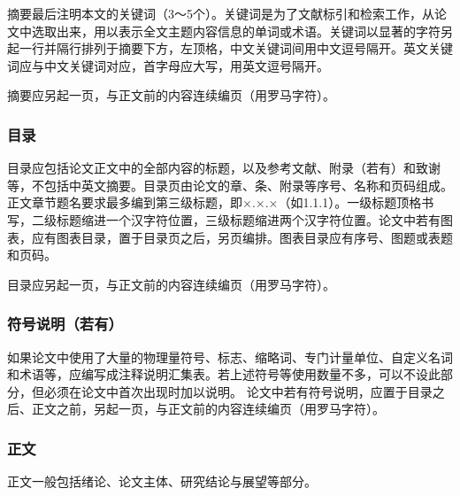 摘要最后注明本文的关键词（3～5个）。关键词是为了文献标引和检索工作，从论文中选取出来，用以表示全文主题内容信息的单词或术语。关键词以显著的字符另起一行并隔行排列于摘要下方，左顶格，中文关键词间用中文逗号隔开。英文关键词应与中文关键词对应，首字母应大写，用英文逗号隔开。

摘要应另起一页，与正文前的内容连续编页（用罗马字符）。
\subsubsection{目录}
目录应包括论文正文中的全部内容的标题，以及参考文献、附录（若有）和致谢等，不包括中英文摘要。目录页由论文的章、条、附录等序号、名称和页码组成。正文章节题名要求最多编到第三级标题，即×.×.×（如1.1.1）。一级标题顶格书写，二级标题缩进一个汉字符位置，三级标题缩进两个汉字符位置。论文中若有图表，应有图表目录，置于目录页之后，另页编排。图表目录应有序号、图题或表题和页码。

目录应另起一页，与正文前的内容连续编页（用罗马字符）。
\subsubsection{符号说明（若有）}
如果论文中使用了大量的物理量符号、标志、缩略词、专门计量单位、自定义名词和术语等，应编写成注释说明汇集表。若上述符号等使用数量不多，可以不设此部分，但必须在论文中首次出现时加以说明。
论文中若有符号说明，应置于目录之后、正文之前，另起一页，与正文前的内容连续编页（用罗马字符）。
\subsubsection{正文}
正文一般包括绪论、论文主体、研究结论与展望等部分。


